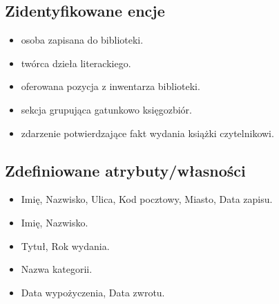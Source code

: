 \documentclass[a4paper,11pt,english,openany,oneside]{sphinxmanual}
\begin{document}
\subsection{Zidentyfikowane encje}
\label{\detokenize{rozdzial_3/index:zidentyfikowane-encje}}\begin{itemize}
\item {} 
\sphinxAtStartPar
{} \sphinxhyphen{} osoba zapisana do biblioteki.

\item {} 
\sphinxAtStartPar
{} \sphinxhyphen{} twórca dzieła literackiego.

\item {} 
\sphinxAtStartPar
{} \sphinxhyphen{} oferowana pozycja z inwentarza biblioteki.

\item {} 
\sphinxAtStartPar
{} \sphinxhyphen{} sekcja grupująca gatunkowo księgozbiór.

\item {} 
\sphinxAtStartPar
{} \sphinxhyphen{} zdarzenie potwierdzające fakt wydania książki czytelnikowi.

\end{itemize}


\subsection{Zdefiniowane atrybuty/własności}
\label{\detokenize{rozdzial_3/index:zdefiniowane-atrybuty-wlasnosci}}\begin{itemize}
\item {} 
\sphinxAtStartPar
{} Imię, Nazwisko, Ulica, Kod pocztowy, Miasto, Data zapisu.

\item {} 
\sphinxAtStartPar
{} Imię, Nazwisko.

\item {} 
\sphinxAtStartPar
{} Tytuł, Rok wydania.

\item {} 
\sphinxAtStartPar
{} Nazwa kategorii.

\item {} 
\sphinxAtStartPar
{} Data wypożyczenia, Data zwrotu.

\end{itemize}
\end{document}
